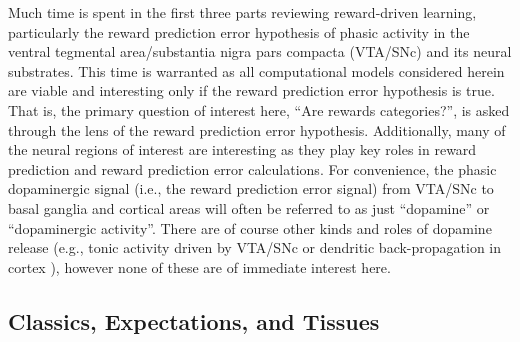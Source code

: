Much time is spent in the first three parts reviewing reward-driven learning, particularly the reward prediction error hypothesis of phasic activity in the ventral tegmental area/substantia nigra pars compacta (VTA/SNc) and its neural substrates.  This time is warranted as all computational models considered herein are viable and interesting only if the reward prediction error hypothesis is true.  That is, the primary question of interest here, ``Are rewards categories?'', is asked through the lens of the reward prediction error hypothesis.  Additionally, many of the neural regions of interest are interesting as they play key roles in reward prediction and reward prediction error calculations.  For convenience, the phasic dopaminergic signal (i.e., the reward prediction error signal) from VTA/SNc to basal ganglia and cortical areas will often be referred to as just ``dopamine'' or ``dopaminergic activity''.  There are of course other kinds and roles of dopamine release (e.g., tonic activity driven by VTA/SNc \citep{schultz:2007aa} or dendritic back-propagation in cortex \citep{jay:2003aa}), however none of these are of immediate interest here.

\subsection{Classics, Expectations, and Tissues} %
\label{sub:cet}
